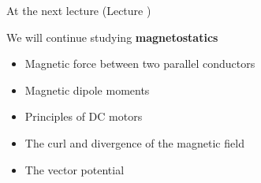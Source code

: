 %
%

\renewcommand{\lecturesummarytitle}{Main points to remember }


%
%

\begin{frame}{At the next lecture (Lecture \nextlecture)}

We will continue studying {\bf magnetostatics}

\begin{itemize}
  \item Magnetic force between  two parallel conductors
  \item Magnetic dipole moments
  \item Principles of DC motors
  \item The curl and divergence of the magnetic field
  \item The vector potential
\end{itemize}

\end{frame}

%
%



